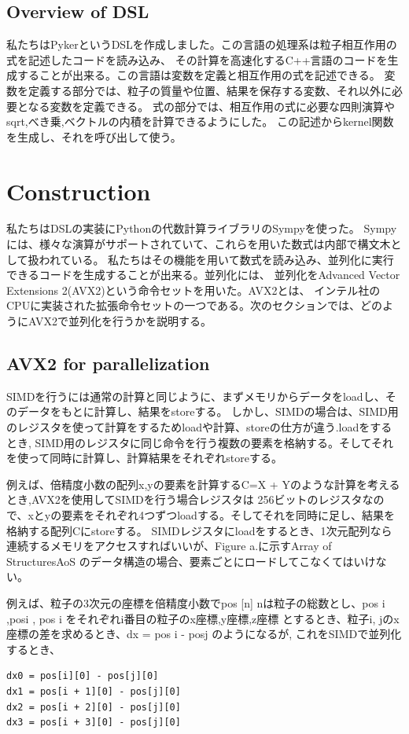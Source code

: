 \documentclass{jarticle}
\begin{document}
\subsection{Overview of DSL}
私たちはPykerというDSLを作成しました。この言語の処理系は粒子相互作用の式を記述したコードを読み込み、
その計算を高速化するC++言語のコードを生成することが出来る。この言語は変数を定義と相互作用の式を記述できる。
変数を定義する部分では、粒子の質量や位置、結果を保存する変数、それ以外に必要となる変数を定義できる。
式の部分では、相互作用の式に必要な四則演算やsqrt,べき乗,ベクトルの内積を計算できるようにした。
この記述からkernel関数を生成し、それを呼び出して使う。



\section{Construction}
私たちはDSLの実装にPythonの代数計算ライブラリのSympyを使った。
Sympyには、様々な演算がサポートされていて、これらを用いた数式は内部で構文木として扱われている。
私たちはその機能を用いて数式を読み込み、並列化に実行できるコードを生成することが出来る。並列化には、
並列化をAdvanced Vector Extensions 2(AVX2)という命令セットを用いた。AVX2とは、
インテル社のCPUに実装された拡張命令セットの一つである。次のセクションでは、どのようにAVX2で並列化を行うかを説明する。

\subsection{AVX2 for parallelization}

SIMDを行うには通常の計算と同じように、まずメモリからデータをloadし、そのデータをもとに計算し、結果をstoreする。
しかし、SIMDの場合は、SIMD用のレジスタを使って計算をするためloadや計算、storeの仕方が違う.loadをするとき,
SIMD用のレジスタに同じ命令を行う複数の要素を格納する。そしてそれを使って同時に計算し、計算結果をそれぞれstoreする。

 例えば、倍精度小数の配列x,yの要素を計算するC=X + Yのような計算を考えるとき,AVX2を使用してSIMDを行う場合レジスタは
256ビットのレジスタなので、xとyの要素をそれぞれ4つずつloadする。そしてそれを同時に足し、結果を格納する配列Cにstoreする。
SIMDレジスタにloadをするとき、1次元配列なら連続するメモリをアクセスすればいいが、Figure a.に示すArray of Structures\lparen AoS \rparen
のデータ構造の場合、要素ごとにロードしてこなくてはいけない。

 例えば、粒子の3次元の座標を倍精度小数でpos [n] \rbrack 
 \lparen nは粒子の総数とし、pos \lbrack i \rbrack {}\rbrack ,pos\lbrack i \rbrack {} \rbrack, pos \lbrack i \rbrack {} \rbrack をそれぞれi番目の粒子のx座標,y座標,z座標 \rparen
  とするとき、粒子i, jのx座標の差を求めるとき、dx = pos \lbrack i \rbrack {} \rbrack - pos\lbrack j \rbrack {} \rbrack のようになるが,
これをSIMDで並列化するとき、
\begin{lstlisting}[frame=single]
dx0 = pos[i][0] - pos[j][0]
dx1 = pos[i + 1][0] - pos[j][0]
dx2 = pos[i + 2][0] - pos[j][0]
dx3 = pos[i + 3][0] - pos[j][0]
\end{lstlisting}
  
\end{document}
